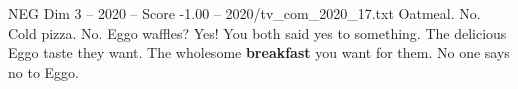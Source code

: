\begin{textsample}{NEG Dim 3 – 2020 – Score -1.00 – 2020/tv\_com\_2020\_17.txt}  \label{ex:f3_neg_034}
Oatmeal.
No.
Cold pizza.
No.
Eggo waffles?
Yes!
You both said yes to something.
The delicious Eggo taste they want.
The wholesome \textbf{breakfast} you want for them.
No one says no to Eggo.

\end{textsample}
